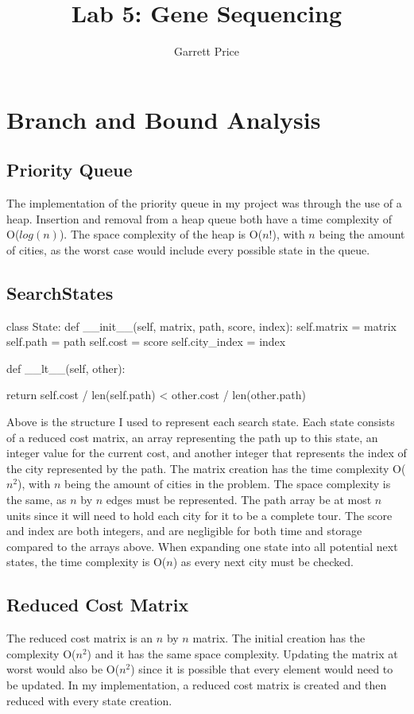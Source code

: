 \documentclass[11pt]{report} %
\title{Lab 5: Gene Sequencing}
\author{Garrett Price}
\begin{document}
\maketitle

\section*{Branch and Bound Analysis}
\subsection*{Priority Queue}
The implementation of the priority queue in my project was through the use of a heap.  Insertion and removal from a heap queue both have a time complexity of O($log(n)$).  The space complexity of the heap is O($n!$), with $n$ being the amount of cities, as the worst case would include every possible state in the queue.
\subsection*{SearchStates}
\begin{pythonLines}
    class State:
    def __init__(self, matrix, path, score, index):
    self.matrix = matrix
    self.path = path
    self.cost = score
    self.city_index = index

    def __lt__(self, other):

    return self.cost / len(self.path) < other.cost / len(other.path)
\end{pythonLines}
Above is the structure I used to represent each search state.  Each state consists of a reduced cost matrix, an array representing the path up to this state, an integer value for the current cost, and another integer that represents the index of the city represented by the path.
The matrix creation has the time complexity O($n^2$), with $n$ being the amount of cities in the problem.  The space complexity is the same, as $n$ by $n$ edges must be represented.  The path array be at most $n$ units since it will need to hold each city for it to be a complete tour.  The score and index are both integers, and are negligible for both time and storage compared to the arrays above.  When expanding one state into all potential next states, the time complexity is O($n$) as every next city must be checked.

\subsection*{Reduced Cost Matrix}
The reduced cost matrix is an $n$ by $n$ matrix.  The initial creation has the complexity O($n^2$) and it has the same space complexity.  Updating the matrix at worst would also be O($n^2$) since it is possible that every element would need to be updated.  In my implementation, a reduced cost matrix is created and then reduced with every state creation.
\end{document}
